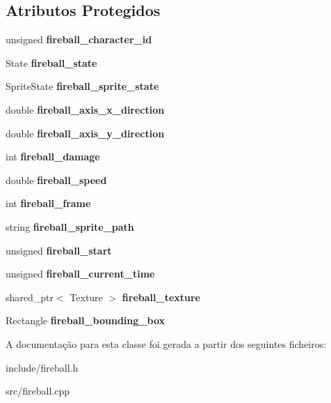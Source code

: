 \subsection*{Atributos Protegidos}
\begin{DoxyCompactItemize}
\item 
\mbox{\label{classFireball_a84186298340b89e4255ef0bc2bbf4e88}} 
unsigned {\bfseries fireball\+\_\+character\+\_\+id}
\item 
\mbox{\label{classFireball_a68da1f63b2154ecb1d14706d410245ee}} 
State {\bfseries fireball\+\_\+state}
\item 
\mbox{\label{classFireball_aacb9344cf4e34345774f518faec82425}} 
Sprite\+State {\bfseries fireball\+\_\+sprite\+\_\+state}
\item 
\mbox{\label{classFireball_af8bd0c78844e754f32f86362f659d875}} 
double {\bfseries fireball\+\_\+axis\+\_\+x\+\_\+direction}
\item 
\mbox{\label{classFireball_a1d912b1e4229e9de2864024fc8b7f0a9}} 
double {\bfseries fireball\+\_\+axis\+\_\+y\+\_\+direction}
\item 
\mbox{\label{classFireball_a2ec7e1493414e15be2eef47f58010622}} 
int {\bfseries fireball\+\_\+damage}
\item 
\mbox{\label{classFireball_a75c66d806eac5f25c076f3bcf37b9613}} 
double {\bfseries fireball\+\_\+speed}
\item 
\mbox{\label{classFireball_a19675b5df10783f6ba27d4af14ac85b0}} 
int {\bfseries fireball\+\_\+frame}
\item 
\mbox{\label{classFireball_ac380cbdccf28a87ee27fae555a22561b}} 
string {\bfseries fireball\+\_\+sprite\+\_\+path}
\item 
\mbox{\label{classFireball_a4d1ebf057ecd8623b13b990b0176d322}} 
unsigned {\bfseries fireball\+\_\+start}
\item 
\mbox{\label{classFireball_a9c1277eb7ce60712afe86ac37ad5371c}} 
unsigned {\bfseries fireball\+\_\+current\+\_\+time}
\item 
\mbox{\label{classFireball_a1b970a7da9435c5b43b431a89b3c8592}} 
shared\+\_\+ptr$<$ Texture $>$ {\bfseries fireball\+\_\+texture}
\item 
\mbox{\label{classFireball_ad2f50d05e164069864ed50ad5d044b87}} 
Rectangle {\bfseries fireball\+\_\+bounding\+\_\+box}
\end{DoxyCompactItemize}


A documentação para esta classe foi gerada a partir dos seguintes ficheiros\+:\begin{DoxyCompactItemize}
\item 
include/fireball.\+h\item 
src/fireball.\+cpp\end{DoxyCompactItemize}

